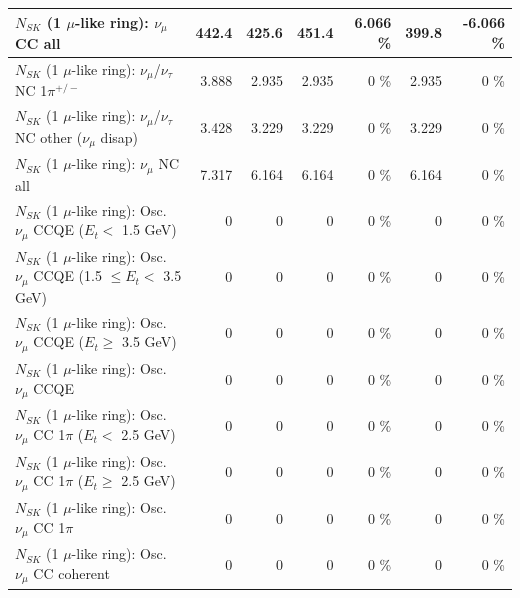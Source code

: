 \begin{table}
\begin{tabular}{| l | r | r | r  r | r  r |}
                                $N_{SK}$ (1 $\mu$-like ring): $\nu_{\mu}$ CC all &           442.4 &           425.6 &           451.4 &    6.066 \%  &           399.8 &   -6.066 \%  \\ 
\hline
              $N_{SK}$ (1 $\mu$-like ring): $\nu_\mu$/$\nu_\tau$ NC 1$\pi^{+/-}$ &           3.888 &           2.935 &           2.935 &        0 \%  &           2.935 &        0 \%  \\ 
   $N_{SK}$ (1 $\mu$-like ring): $\nu_\mu$/$\nu_\tau$ NC other ($\nu_\mu$ disap) &           3.428 &           3.229 &           3.229 &        0 \%  &           3.229 &        0 \%  \\ 
                                $N_{SK}$ (1 $\mu$-like ring): $\nu_{\mu}$ NC all &           7.317 &           6.164 &           6.164 &        0 \%  &           6.164 &        0 \%  \\ 
\hline
\hline
           $N_{SK}$ (1 $\mu$-like ring): Osc. $\nu_\mu$ CCQE ($E_{t} <$ 1.5 GeV) &               0 &               0 &               0 &        0 \%  &               0 &        0 \%  \\ 
  $N_{SK}$ (1 $\mu$-like ring): Osc. $\nu_\mu$ CCQE (1.5 $\leq E_{t} <$ 3.5 GeV) &               0 &               0 &               0 &        0 \%  &               0 &        0 \%  \\ 
        $N_{SK}$ (1 $\mu$-like ring): Osc. $\nu_\mu$ CCQE ($E_{t} \geq$ 3.5 GeV) &               0 &               0 &               0 &        0 \%  &               0 &        0 \%  \\ 
\hline
                               $N_{SK}$ (1 $\mu$-like ring): Osc. $\nu_\mu$ CCQE &               0 &               0 &               0 &        0 \%  &               0 &        0 \%  \\ 
\hline
      $N_{SK}$ (1 $\mu$-like ring): Osc. $\nu_\mu$ CC 1$\pi$ ($E_{t} <$ 2.5 GeV) &               0 &               0 &               0 &        0 \%  &               0 &        0 \%  \\ 
   $N_{SK}$ (1 $\mu$-like ring): Osc. $\nu_\mu$ CC 1$\pi$ ($E_{t} \geq$ 2.5 GeV) &               0 &               0 &               0 &        0 \%  &               0 &        0 \%  \\ 
\hline
                          $N_{SK}$ (1 $\mu$-like ring): Osc. $\nu_\mu$ CC 1$\pi$ &               0 &               0 &               0 &        0 \%  &               0 &        0 \%  \\ 
                        $N_{SK}$ (1 $\mu$-like ring): Osc. $\nu_\mu$ CC coherent &               0 &               0 &               0 &        0 \%  &               0 &        0 \%  \\ 

\end{tabular}
\end{table}
